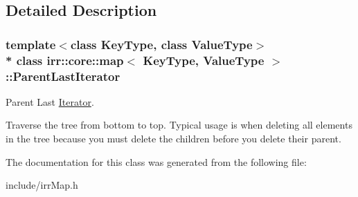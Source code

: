 \subsection{Detailed Description}
\subsubsection*{template$<$class Key\+Type, class Value\+Type$>$\\*
class irr\+::core\+::map$<$ Key\+Type, Value\+Type $>$\+::\+Parent\+Last\+Iterator}

Parent Last \hyperlink{classirr_1_1core_1_1map_1_1Iterator}{Iterator}. 

Traverse the tree from bottom to top. Typical usage is when deleting all elements in the tree because you must delete the children before you delete their parent. 

The documentation for this class was generated from the following file\+:\begin{DoxyCompactItemize}
\item 
include/irr\+Map.\+h\end{DoxyCompactItemize}
